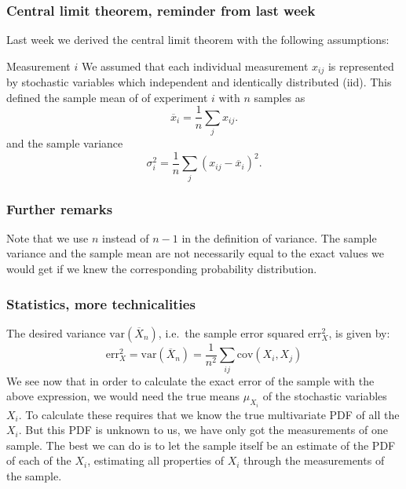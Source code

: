 \documentclass{beamer}
\begin{document}
\begin{frame}
\frametitle{Central limit theorem, reminder from last week}

Last week we derived the central limit theorem with the following assumptions:

\begin{block}{Measurement $i$ }
We assumed that each individual measurement $x_{ij}$ is represented by stochastic variables which independent and identically distributed (iid).
This defined the sample mean of of experiment $i$ with $n$ samples as
\[
\overline{x}_i=\frac{1}{n}\sum_{j} x_{ij}.
\]
and the sample variance
\[
\sigma^2_i=\frac{1}{n}\sum_{j} \left(x_{ij}-\overline{x}_i\right)^2.
\]
\end{block}
\end{frame}

\begin{frame}
\frametitle{Further remarks}

Note that we use $n$ instead of $n-1$ in the definition of
variance. The sample variance and the sample mean are not necessarily equal to
the exact values we would get if we knew the corresponding probability
distribution.
\end{frame}

\begin{frame}
\frametitle{Statistics, more technicalities}

\begin{block}{}
The desired variance
$\mathrm{var}(\overline X_n)$, i.e.~the sample error squared
$\mathrm{err}_X^2$, is given by:
\begin{equation}
\mathrm{err}_X^2 = \mathrm{var}(\overline X_n) = \frac{1}{n^2}
\sum_{ij} \mathrm{cov}(X_i, X_j)
\label{eq:error_exact}
\end{equation}
We see now that in order to calculate the exact error of the sample
with the above expression, we would need the true means
$\mu_{X_i}^{\phantom X}$ of the stochastic variables $X_i$. To
calculate these requires that we know the true multivariate PDF of all
the $X_i$. But this PDF is unknown to us, we have only got the measurements of
one sample. The best we can do is to let the sample itself be an
estimate of the PDF of each of the $X_i$, estimating all properties of
$X_i$ through the measurements of the sample.
\end{block}
\end{frame}
\end{document}

